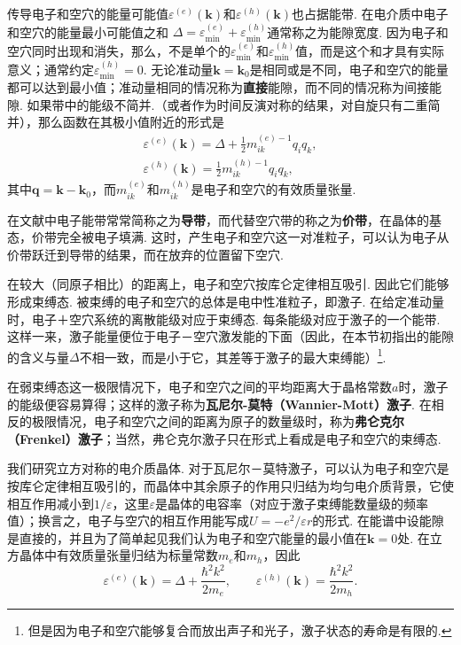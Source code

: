传导电子和空穴的能量可能值$\varepsilon^{(e)}(\bm{k})$和$\varepsilon^{(h)}(\bm{k})$也占据能带. 在电介质中电子和空穴的能量最小可能值之和
$\Delta=\varepsilon^{(e)}_{\min}+\varepsilon^{(h)}_{\min}$通常称之为能隙宽度. 因为电子和空穴同时出现和消失，那么，不是单个的$\varepsilon^{(e)}_{\min}$和$\varepsilon^{(h)}_{\min}$值，而是这个和才具有实际意义；通常约定$\varepsilon^{(h)}_{\min}=0$. 无论准动量$\bm{k}=\bm{k}_0$是相同或是不同，电子和空穴的能量都可以达到最小值；准动量相同的情况称为\textbf{直接}能隙，而不同的情况称为间接能隙. 如果带中的能级不简并.（或者作为时间反演对称的结果，对自旋只有二重简并），那么函数在其极小值附近的形式是
\begin{equation}
\begin{gathered}
\varepsilon^{(e)}(\bm{k})=\Delta+\frac{1}{2}m^{(e)-1}_{ik}q_iq_k,\\
\varepsilon^{(h)}(\bm{k})=\frac{1}{2}m^{(h)-1}_{ik}q_iq_k,
\end{gathered}
\end{equation}
其中$\bm{q}=\bm{k}-\bm{k}_0$，而$m^{(e)}_{ik}$和$m^{(h)}_{ik}$是电子和空穴的有效质量张量.

在文献中电子能带常常简称之为\textbf{导带}，而代替空穴带的称之为\textbf{价带}，在晶体的基态，价带完全被电子填满. 这时，产生电子和空穴这一对准粒子，可以认为电子从价带跃迁到导带的结果，而在放弃的位置留下空穴.

在较大（同原子相比）的距离上，电子和空穴按库仑定律相互吸引. 因此它们能够形成束缚态. 被束缚的电子和空穴的总体是电中性准粒子，即激子. 在给定准动量时，电子＋空穴系统的离散能级对应于束缚态. 每条能级对应于激子的一个能带. 这样一来，激子能量便位于电子－空穴激发能的下面（因此，在本节初指出的能隙的含义与量$\Delta$不相一致，而是小于它，其差等于激子的最大束缚能）\footnote{但是因为电子和空穴能够复合而放出声子和光子，激子状态的寿命是有限的.}.

在弱束缚态这一极限情况下，电子和空穴之间的平均距离大于晶格常数$a$时，激子的能级便容易算得；这样的激子称为\textbf{瓦尼尔-莫特（Wannier-Mott）激子}. 在相反的极限情况，电子和空穴之间的距离为原子的数量级时，称为\textbf{弗仑克尔（Frenkel）激子}；当然，弗仑克尔激子只在形式上看成是电子和空穴的束缚态.

我们研究立方对称的电介质晶体. 对于瓦尼尔－莫特激子，可以认为电子和空穴是按库仑定律相互吸引的，而晶体中其余原子的作用只归结为均匀电介质背景，它使相互作用减小到$1/\varepsilon$，这里$\varepsilon$是晶体的电容率（对应于激子束缚能数量级的频率值）；换言之，电子与空穴的相互作用能写成$U=-e^2/\varepsilon r$的形式. 在能谱中设能隙是直接的，并且为了简单起见我们认为电子和空穴能量的最小值在$\bm{k}=0$处. 在立方晶体中有效质量张量归结为标量常数$m_e$和$m_h$，因此
\begin{equation}
\varepsilon^{(e)}(\bm{k})=\Delta+\frac{\hbar^2k^2}{2m_e},
\qquad
\varepsilon^{(h)}(\bm{k})=\frac{\hbar^2k^2}{2m_h}.
\end{equation}

